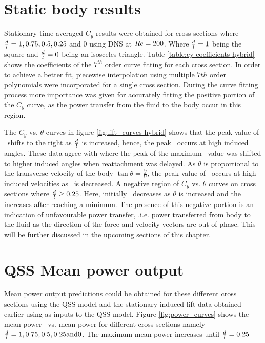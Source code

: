 \section{Static body results}
\label{sec:cross-sec-Static body results}


Stationary time averaged $C_y$ results were obtained for cross sections where $\frac{d}{l}=1,0.75,0.5,0.25$ and $0$ using DNS at $Re=200$. Where $\frac{d}{l}=1$ being the square and $\frac{d}{l}=0$ being an isosceles  triangle. Table \ref{table:cy-coefficients-hybrid} shows the coefficients of the $7^{th}$ order curve fitting for each cross section. In order to achieve a better fit, piecewise interpolation using multiple $7th$ order polynomials were incorporated for a single cross section. During the curve fitting process more importance was given for accurately fitting  the positive portion of the $C_{y}$ curve, as the power transfer from the fluid to the body occur in this region. 

 

The $C_y$ vs. $\theta$ curves in figure \ref{fig:lift_curves-hybrid} shows that the peak value of \cy\ shifts to the right as $\frac{d}{l}$ is increased, hence, the peak \cy\ occurs at high induced angles.  These data agree with \citet{Luo1994} where the peak of the maximum \cy\ value was shifted to higher induced angles when reattachment was delayed. As $\theta$ is proportional to the transverse velocity of the body $\tan{\theta}=\frac{\dot{y}}{U}$, the peak value of \cy\ occurs at high induced velocities as \ratio\ is decreased. A negative region of $C_y$ vs. $\theta$ curves on cross sections where $\frac{d}{l}\geq0.25$. Here, initially \cy\ decreases as $\theta$ is increased and the increases after reaching a minimum. The presence of this negative portion is an indication of unfavourable power transfer, .i.e. power transferred from body to the fluid as the direction of the force and velocity vectors are out of phase. This will be further discussed in the upcoming sections of this chapter.    

 
 
 \section{QSS Mean power output}
 \label{sec:cross-sec-qss-mean power}
 
 
 
 Mean power output predictions could be obtained for these different cross sections using the QSS model and the stationary induced lift data obtained earlier using as inputs to the QSS model. Figure \ref{fig:power_curves} shows the mean power \massdamp\ vs. mean power for different cross sections namely $\frac{d}{l}=1,0.75,0.5,0.25 \text{and} 0$. The maximum mean power increases until $\frac{d}{l}=0.25$ 
 
 
 
 
 



